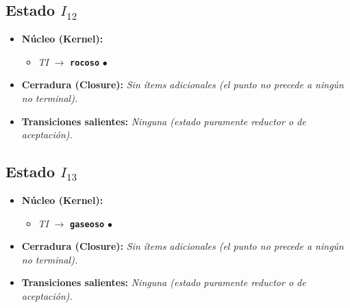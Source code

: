\documentclass[12pt, letterpaper]{article}
\begin{document}
\subsection*{Estado $I_{12}$ }
\begin{itemize}\setlength{\itemsep}{1pt}\setlength{\parskip}{0pt}
\item \textbf{Núcleo (Kernel):}
\begin{itemize}\setlength{\itemsep}{1pt}\setlength{\parskip}{0pt}
    \item \textit{TI} $\to$ \textbf{\texttt{rocoso}} $\bullet$ 
\end{itemize}
\item \textbf{Cerradura (Closure):} \emph{Sin ítems adicionales (el punto no precede a ningún no terminal).}
\item \textbf{Transiciones salientes:} \emph{Ninguna (estado puramente reductor o de aceptación).}
\end{itemize}
\vspace{2pt}
\subsection*{Estado $I_{13}$ }
\begin{itemize}\setlength{\itemsep}{1pt}\setlength{\parskip}{0pt}
\item \textbf{Núcleo (Kernel):}
\begin{itemize}\setlength{\itemsep}{1pt}\setlength{\parskip}{0pt}
    \item \textit{TI} $\to$ \textbf{\texttt{gaseoso}} $\bullet$ 
\end{itemize}
\item \textbf{Cerradura (Closure):} \emph{Sin ítems adicionales (el punto no precede a ningún no terminal).}
\item \textbf{Transiciones salientes:} \emph{Ninguna (estado puramente reductor o de aceptación).}
\end{itemize}
\vspace{2pt}
\end{document}
